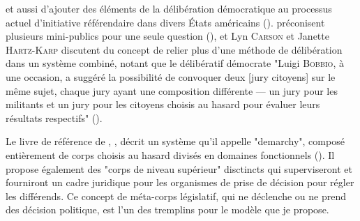 et aussi d'ajouter des éléments de la délibération démocratique au 
processus actuel d'initiative référendaire dans divers \'Etats
américains (\autocite{gast12}). \autocite{calvert12} préconisent
plusieurs mini-publics pour une seule question (\autocite{calvert12}), et
Lyn \textsc{Carson} et Janette \textsc{Hartz-Karp} discutent du concept
de relier plus d'une méthode de délibération dans un système combiné,
notant que le délibératif démocrate "Luigi \textsc{Bobbio}, à une
occasion, a suggéré la possibilité de convoquer deux [jury citoyens]
sur le même sujet, chaque jury ayant une composition différente --- un
jury pour les militants et un jury pour les citoyens choisis au hasard pour
évaluer leurs résultats respectifs" (\autocite{cars06}).\par
Le livre de référence de  \autocite{burn85}, \autocite{burn85},
décrit un système qu'il appelle "demarchy", composé entièrement de
corps choisis au hasard divisés en domaines fonctionnels
(\autocite{burn85}). Il propose également des "corps de niveau 
supérieur" disctincts qui superviseront et fourniront un cadre
juridique pour les organismes de prise de décision pour régler les
différends. Ce concept de méta-corps législatif, qui ne déclenche ou
ne prend des décision politique, est l'un des tremplins pour le
modèle que je propose.\par

